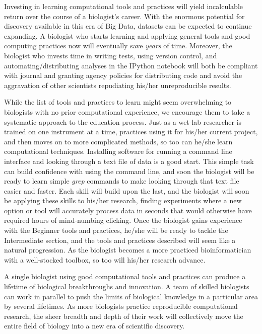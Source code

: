 \documentclass[ChapterTOCs,krantz2]{krantz} %
\begin{document}
Investing in learning computational tools and practices will yield incalculable
return over the course of a biologist's career.  With the enormous potential
for discovery available in this era of Big Data, datasets can be expected to
continue expanding.  A biologist who starts learning and applying general tools
and good computing practices now will eventually save \emph{years} of time.
Moreover, the biologist who invests time in writing tests, using version
control, and automating/distributing analyses in the IPython notebook will both
be compliant with journal and granting agency policies for distributing code
and avoid the aggravation of other scientists repudiating his/her
unreproducible results.

While the list of tools and practices to learn might seem overwhelming to
biologists with no prior computational experience, we encourage them to take a
systematic approach to the education process.  Just as a wet-lab researcher is
trained on one instrument at a time, practices using it for
his/her current project, and then moves on to more complicated methods, so too
can he/she learn computational techniques.  Installing software for
running a command line interface and looking through a text file of data is a
good start.  This simple task can build confidence with using the command line,
and soon the biologist will be ready to learn simple \emph{grep} commands to make
looking through that text file easier and faster.  Each skill will build upon
the last, and the biologist will soon be applying these skills to his/her
research, finding experiments where a new option or tool will
accurately process data in seconds that would otherwise have required hours of
mind-numbing clicking.  Once the biologist gains experience with the Beginner
tools and practices, he/she will be ready to tackle the Intermediate section,
and the tools and practices described will seem like a natural progression.  As
the biologist becomes a more practiced bioinformatician with a well-stocked
toolbox, so too will his/her research advance.  

A single biologist using good computational tools and
practices can produce a lifetime of biological breakthroughs and innovation.  A
team of skilled biologists can work in parallel to push the
limits of biological knowledge in a particular area by several lifetimes.  As
more biologists practice reproducible computational research, the sheer breadth
and depth of their work will collectively move the entire field of biology into
a new era of scientific discovery.
\end{document}
